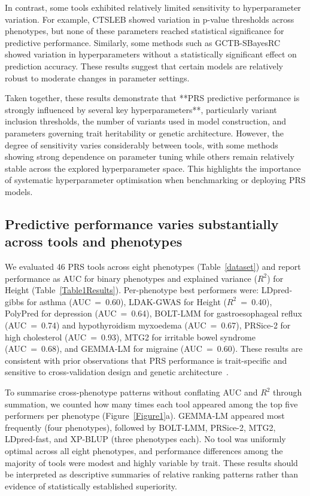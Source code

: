 \documentclass[pdflatex,sn-basic]{sn-jnl}
\begin{document}
In contrast, some tools exhibited relatively limited sensitivity to hyperparameter variation. For example, CTSLEB showed variation in p-value thresholds across phenotypes, but none of these parameters reached statistical significance for predictive performance. Similarly, some methods such as GCTB-SBayesRC showed variation in hyperparameters without a statistically significant effect on prediction accuracy. These results suggest that certain models are relatively robust to moderate changes in parameter settings.

Taken together, these results demonstrate that **PRS predictive performance is strongly influenced by several key hyperparameters**, particularly variant inclusion thresholds, the number of variants used in model construction, and parameters governing trait heritability or genetic architecture. However, the degree of sensitivity varies considerably between tools, with some methods showing strong dependence on parameter tuning while others remain relatively stable across the explored hyperparameter space. This highlights the importance of systematic hyperparameter optimisation when benchmarking or deploying PRS models.

 

\subsection*{Predictive performance varies substantially across tools and phenotypes}

We evaluated 46 PRS tools across eight phenotypes (Table~\ref{dataset}) and report performance as AUC for binary phenotypes and explained variance ($R^{2}$) for Height (Table~\ref{Table1Results}). Per-phenotype best performers were: LDpred-gibbs for asthma (AUC~=~0.60), LDAK-GWAS for Height ($R^{2}$~=~0.40), PolyPred for depression (AUC~=~0.64), BOLT-LMM for gastroesophageal reflux (AUC~=~0.74) and hypothyroidism myxoedema (AUC~=~0.67), PRSice-2 for high cholesterol (AUC~=~0.93), MTG2 for irritable bowel syndrome (AUC~=~0.68), and GEMMA-LM for migraine (AUC~=~0.60). These results are consistent with prior observations that PRS performance is trait-specific and sensitive to cross-validation design and genetic architecture~\cite{Ma2021}.

To summarise cross-phenotype patterns without conflating AUC and $R^{2}$ through summation, we counted how many times each tool appeared among the top five performers per phenotype (Figure~\ref{Figure1}a). GEMMA-LM appeared most frequently (four phenotypes), followed by BOLT-LMM, PRSice-2, MTG2, LDpred-fast, and XP-BLUP (three phenotypes each). No tool was uniformly optimal across all eight phenotypes, and performance differences among the majority of tools were modest and highly variable by trait. These results should be interpreted as descriptive summaries of relative ranking patterns rather than evidence of statistically established superiority.
\end{document}
